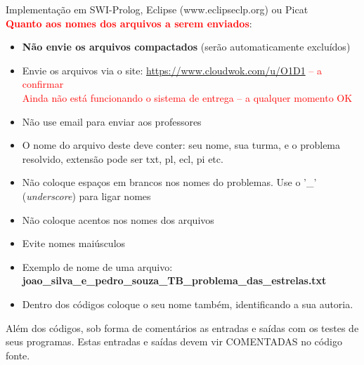 \documentclass[a4paper,12pt]{article}
\begin{document}
\begin{flushleft}


\vspace{0.5cm}
 Implementação em SWI-Prolog, Eclipse (www.eclipseclp.org) ou Picat\\

\vspace{0.5cm}
 \textcolor{red}{\textbf{Quanto aos nomes dos arquivos a serem enviados}}:
\begin{itemize}
  \item \textbf{Não envie os arquivos compactados} (serão automaticamente excluídos)
  \item Envie os arquivos  via o site: \textcolor{red}{\url{https://www.cloudwok.com/u/O1D1}  -- a confirmar}\\
  \textcolor{red}{Ainda não está funcionando o sistema de entrega -- a qualquer momento OK}

  \item Não use email para enviar aos professores
  
  \item O nome do arquivo deste deve conter: seu nome,
  sua turma, e o problema resolvido, extensão pode ser txt, pl, ecl, pi etc.
  \item Não coloque espaços em brancos nos nomes do problemas. Use o '\_'  (\textit{underscore}) para ligar nomes
  
  \item Não coloque acentos nos nomes dos arquivos
  
  \item Evite nomes maiúsculos
  
  \item Exemplo de nome de uma arquivo: \\ \textbf{joao\_silva\_e\_pedro\_souza\_TB\_problema\_das\_estrelas.txt}
  
  \item Dentro dos códigos coloque o seu nome também, identificando a sua autoria.
  
\end{itemize}


\vspace{0.5cm}
 Além dos códigos, sob forma de comentários as 
entradas e saídas com os testes de seus programas. Estas
entradas e saídas devem vir COMENTADAS no código fonte.


\end{flushleft}
\end{document}
